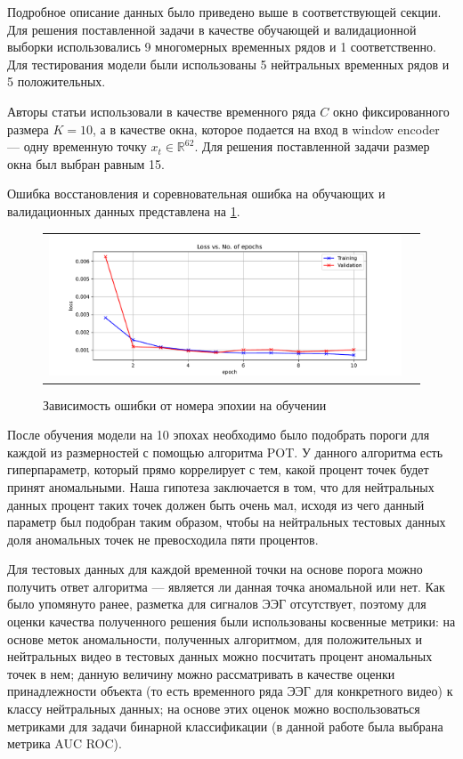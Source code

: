 \documentclass{article}
\begin{document}
Подробное описание данных было приведено выше в соответствующей секции. Для решения поставленной задачи в качестве обучающей и валидационной выборки использовались 9 многомерных временных рядов и 1 соответственно. Для тестирования модели были использованы 5 нейтральных временных рядов и 5 положительных. 

Авторы статьи использовали в качестве временного ряда $C$ окно фиксированного размера $K = 10$, а в качестве окна, которое подается на вход в window encoder --- одну временную точку $x_t \in \mathbb{R}^{62}$. Для решения поставленной задачи размер окна был выбран равным 15. 

Ошибка восстановления и соревновательная ошибка на обучающих и валидационных данных представлена на \ref{fig:mist}.

\begin{figure}[h]
\begin{tabular}{cc}
  \includegraphics[width=160mm]{7.pdf}
\end{tabular}
\caption{Зависимость ошибки от номера эпохии на обучении}
\label{fig:mist}
\end{figure}

После обучения модели на 10 эпохах необходимо было подобрать пороги для каждой из размерностей с помощью алгоритма POT. У данного алгоритма есть гиперпараметр, который прямо коррелирует с тем, какой процент точек будет принят аномальными. Наша гипотеза заключается в том, что для нейтральных данных процент таких точек должен быть очень мал, исходя из чего данный параметр был подобран таким образом, чтобы на нейтральных тестовых данных доля аномальных точек не превосходила пяти процентов. 

Для тестовых данных для каждой временной точки на основе порога можно получить ответ алгоритма --- является ли данная точка аномальной или нет. Как было упомянуто ранее, разметка для сигналов ЭЭГ отсутствует, поэтому для оценки качества полученного решения были использованы косвенные метрики: на основе меток аномальности, полученных алгоритмом, для положительных и нейтральных видео в тестовых данных можно посчитать процент аномальных точек в нем; данную величину можно рассматривать в качестве оценки принадлежности объекта (то есть временного ряда ЭЭГ для конкретного видео) к классу нейтральных данных; на основе этих оценок можно воспользоваться метриками для задачи бинарной классификации (в данной работе была выбрана метрика AUC ROC).
\end{document}
